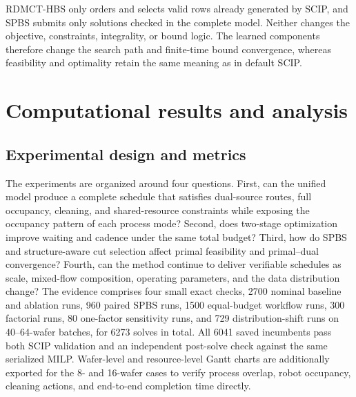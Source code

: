 \documentclass[final,5p,times,twocolumn]{elsarticle}
\newcommand{\method}{RDMCT-HBS}
\begin{document}
\method{} only orders and selects valid rows already generated by SCIP, and SPBS submits only solutions checked in the complete model. Neither changes the objective, constraints, integrality, or bound logic. The learned components therefore change the search path and finite-time bound convergence, whereas feasibility and optimality retain the same meaning as in default SCIP.

\section{Computational results and analysis}
\label{sec:results-new}

\subsection{Experimental design and metrics}

The experiments are organized around four questions. First, can the unified model produce a complete schedule that satisfies dual-source routes, full occupancy, cleaning, and shared-resource constraints while exposing the occupancy pattern of each process mode? Second, does two-stage optimization improve waiting and cadence under the same total budget? Third, how do SPBS and structure-aware cut selection affect primal feasibility and primal--dual convergence? Fourth, can the method continue to deliver verifiable schedules as scale, mixed-flow composition, operating parameters, and the data distribution change? The evidence comprises four small exact checks, 2700 nominal baseline and ablation runs, 960 paired SPBS runs, 1500 equal-budget workflow runs, 300 factorial runs, 80 one-factor sensitivity runs, and 729 distribution-shift runs on 40--64-wafer batches, for 6273 solves in total. All 6041 saved incumbents pass both SCIP validation and an independent post-solve check against the same serialized MILP. Wafer-level and resource-level Gantt charts are additionally exported for the 8- and 16-wafer cases to verify process overlap, robot occupancy, cleaning actions, and end-to-end completion time directly.
\end{document}
